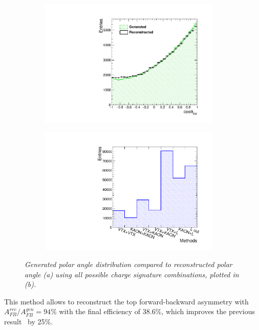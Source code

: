 \begin{figure}[h]
	\centering
	\begin{subfigure}{0.5\textwidth}
		\includegraphics[width=0.95\textwidth]{ILD/plots/top-asymmetry-lepton.pdf}
		\caption{\label{fig:TopAsymmetryChi_a_3} }
	\end{subfigure}%
	\begin{subfigure}{0.5\textwidth}
		\centering
		\includegraphics[width=0.95\textwidth]{ILD/plots/top-methods-lepton.pdf}
		\caption{\label{fig:TopAsymmetryChi_b_3} }
	\end{subfigure}
	\caption{\sl Generated polar angle distribution compared to reconstructed polar angle (a) using all possible charge signature combinations, plotted in (b). }
	\label{fig:TopAsymmetryChi_3}
\end{figure}

This method allows to reconstruct the top forward-backward asymmetry with $A_{FB}^{rec}/A^{gen}_{FB} = 94\%$ with the final efficiency of 38.6\%, which improves the previous result~\cite{bib:ILCTOP} by 25\%. 

